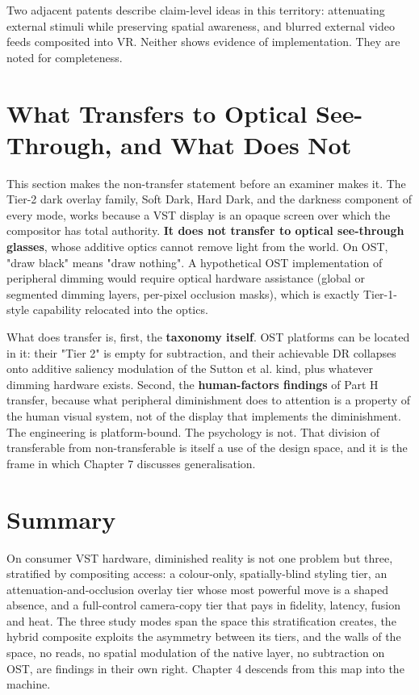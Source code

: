 Two adjacent patents \citep{patents} describe claim-level ideas in this territory:
attenuating external stimuli while preserving spatial awareness, and blurred external video feeds
composited into VR. Neither shows evidence of implementation. They are noted for
completeness.

\section{What Transfers to Optical See-Through, and What Does Not}

This section makes the non-transfer statement before an examiner makes it. The Tier-2 dark overlay
family, Soft Dark, Hard Dark, and the darkness component of every mode, works because a VST display
is an opaque screen over which the compositor has total authority. \textbf{It does not transfer to optical
see-through glasses}, whose additive optics cannot remove light from the world. On OST, "draw black"
means "draw nothing". A hypothetical OST implementation of peripheral dimming would require optical
hardware assistance (global or segmented dimming layers, per-pixel occlusion masks), which is exactly
Tier-1-style capability relocated into the optics.

What does transfer is, first, the \textbf{taxonomy itself}. OST platforms can be located in it: their
"Tier 2" is empty for subtraction, and their achievable DR collapses onto additive saliency modulation
of the Sutton et al. kind, plus whatever dimming hardware exists. Second, the \textbf{human-factors
findings} of Part H transfer, because what peripheral diminishment does to attention is a property of
the human visual system, not of the display that implements the diminishment. The engineering is
platform-bound. The psychology is not. That division of transferable from non-transferable is itself
a use of the design space, and it is the frame in which Chapter 7 discusses generalisation.

\section{Summary}

On consumer VST hardware, diminished reality is not one problem but three, stratified by compositing
access: a colour-only, spatially-blind styling tier, an attenuation-and-occlusion overlay tier whose
most powerful move is a shaped absence, and a full-control camera-copy tier that pays in fidelity,
latency, fusion and heat. The three study modes span the space this stratification creates, the
hybrid composite exploits the asymmetry between its tiers, and the walls of the space, no reads, no
spatial modulation of the native layer, no subtraction on OST, are findings in their own right.
Chapter 4 descends from this map into the machine.
